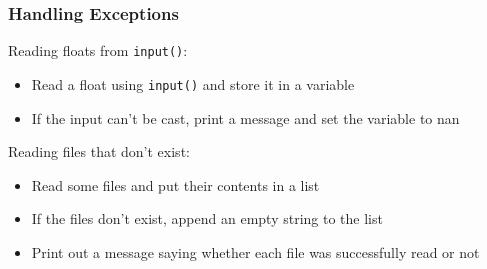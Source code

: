 \documentclass{beamer}
\newcommand{\code}[1]{\texttt{#1}}
\begin{document}
\begin{frame}	
	\frametitle{Handling Exceptions}
	
	\begin{exampleblock}{Reading floats from \code{input()}:}
		\begin{itemize}
			\item Read a float using \code{input()} and store it in a variable
			\item If the input can't be cast, print a message and set the variable to nan
		\end{itemize}
	\end{exampleblock}
	
	\begin{exampleblock}{Reading files that don't exist:}
		\begin{itemize}
			\item Read some files and put their contents in a list
			\item If the files don't exist, append an empty string to the list
			\item Print out a message saying whether each file was successfully read or not
		\end{itemize}
	\end{exampleblock}
	
\end{frame}
\end{document}
